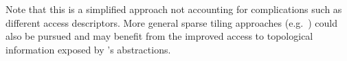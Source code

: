 \documentclass[thesis]{subfiles}
\begin{document}
Note that this is a simplified approach not accounting for complications such as different access descriptors.
More general sparse tiling approaches (e.g.~\cite{kriegerLoopChainingProgramming2013,stroutGeneralizingRunTimeTiling2014,10.1145/3302256}) could also be pursued and may benefit from the improved access to topological information exposed by 's abstractions.
\end{document}
